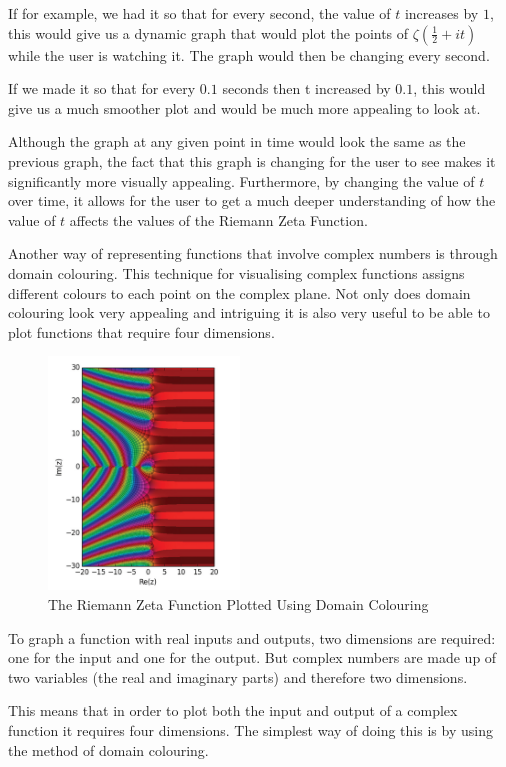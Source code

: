 \documentclass[12pt]{article}
\begin{document}
If for example, we had it so that for every second, the value of $t$ increases by $1$, this would give us a dynamic graph that would plot the points of $\zeta(\frac{1}{2}+it)$ while the user is watching it. The graph would then be changing every second.

If we made it so that for every $0.1$ seconds then t increased by $0.1$, this would give us a much smoother plot and would be much more appealing to look at.

Although the graph at any given point in time would look the same as the previous graph, the fact that this graph is changing for the user to see makes it significantly more visually appealing. Furthermore, by changing the value of $t$ over time, it allows for the user to get a much deeper understanding of how the value of $t$ affects the values of the Riemann Zeta Function.

Another way of representing functions that involve complex numbers is through domain colouring. This technique for visualising complex functions assigns different colours to each point on the complex plane. Not only does domain colouring look very appealing and intriguing it is also very useful to be able to plot functions that require four dimensions.

\clearpage

\begin{figure}
    \centering
    \captionsetup{justification=centering}
    \includegraphics[width=2.0in]{domain-colouring-plot}
    \caption{The Riemann Zeta Function Plotted Using Domain Colouring}
\end{figure}

To graph a function with real inputs and outputs, two dimensions are required: one for the input and one for the output. But complex numbers are made up of two variables (the real and imaginary parts) and therefore two dimensions.

This means that in order to plot both the input and output of a complex function it requires four dimensions. The simplest way of doing this is by using the method of domain colouring.
\end{document}
